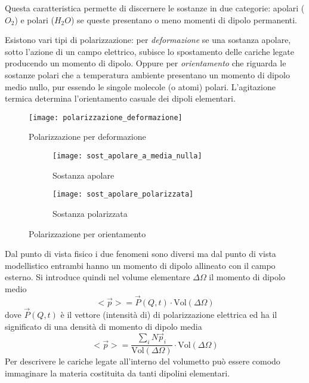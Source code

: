 Questa caratteristica permette di discernere le sostanze in due categorie: apolari ($O_2$) e polari
($H_2O$) se queste presentano o meno momenti di dipolo permanenti.

Esistono vari tipi di polarizzazione: per \textit{deformazione} se una sostanza apolare, sotto 
l'azione di un campo elettrico, subisce lo spostamento delle cariche legate producendo 
un momento di dipolo.
Oppure per \textit{orientamento} che riguarda le sostanze polari che a temperatura ambiente
presentano un momento di dipolo medio nullo, pur essendo le singole molecole (o atomi) polari.
L'agitazione termica determina l'orientamento casuale dei dipoli elementari.

\begin{figure}[h!]
 \centering
 \texttt{[image: polarizzazione\_deformazione]}
 \caption{Polarizzazione per deformazione}
\end{figure}


\begin{figure}[h!]
 \begin{subfigure}{.5\textwidth}
 \centering
 \texttt{[image: sost\_apolare\_a\_media\_nulla]}
 \caption{Sostanza apolare}
 \end{subfigure} 
 \begin{subfigure}{.5\textwidth}
\centering
 \texttt{[image: sost\_apolare\_polarizzata]}
 \caption{Sostanza polarizzata}
 \end{subfigure}
 \caption{Polarizzazione per orientamento}
\end{figure}

Dal punto di vista fisico i due fenomeni sono diversi ma dal punto di vista modellistico
entrambi hanno un momento di dipolo allineato con il campo esterno.
Si introduce quindi nel volume elementare $\Delta\Omega$ il momento di dipolo medio
$$
<\vec{p}> = \vec{P}(Q,t)\cdot \text{Vol}(\Delta\Omega)
$$
dove $\vec{P}(Q,t)$ è il vettore (intensità di) di polarizzazione elettrica ed ha il significato 
di una densità di momento di dipolo media
$$
<\vec{p}> = \frac{\sum_i N\vec{p}_i}{\text{Vol}(\Delta\Omega)}\cdot \text{Vol}(\Delta\Omega)
$$
Per descrivere le cariche legate all'interno del volumetto può essere comodo immaginare la materia
costituita da tanti dipolini elementari.
